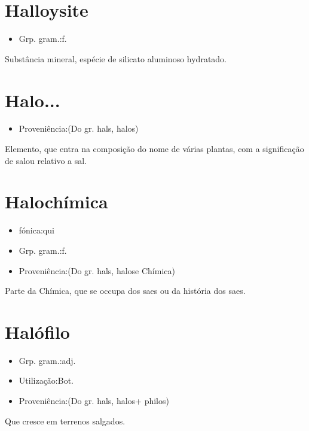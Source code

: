 \documentclass{article}
\begin{document}
\section{Halloysite}
\begin{itemize}
\item {Grp. gram.:f.}
\end{itemize}
Substância mineral, espécie de silicato aluminoso hydratado.
\section{Halo...}
\begin{itemize}
\item {Proveniência:(Do gr. \textunderscore hals\textunderscore , \textunderscore halos\textunderscore )}
\end{itemize}
Elemento, que entra na composição do nome de várias plantas, com a significação de \textunderscore sal\textunderscore  ou \textunderscore relativo a sal\textunderscore .
\section{Halochímica}
\begin{itemize}
\item {fónica:qui}
\end{itemize}
\begin{itemize}
\item {Grp. gram.:f.}
\end{itemize}
\begin{itemize}
\item {Proveniência:(Do gr. \textunderscore hals\textunderscore , \textunderscore halos\textunderscore  e \textunderscore Chímica\textunderscore )}
\end{itemize}
Parte da Chímica, que se occupa dos saes ou da história dos saes.
\section{Halófilo}
\begin{itemize}
\item {Grp. gram.:adj.}
\end{itemize}
\begin{itemize}
\item {Utilização:Bot.}
\end{itemize}
\begin{itemize}
\item {Proveniência:(Do gr. \textunderscore hals\textunderscore , \textunderscore halos\textunderscore  + \textunderscore philos\textunderscore )}
\end{itemize}
Que cresce em terrenos salgados.
\end{document}
